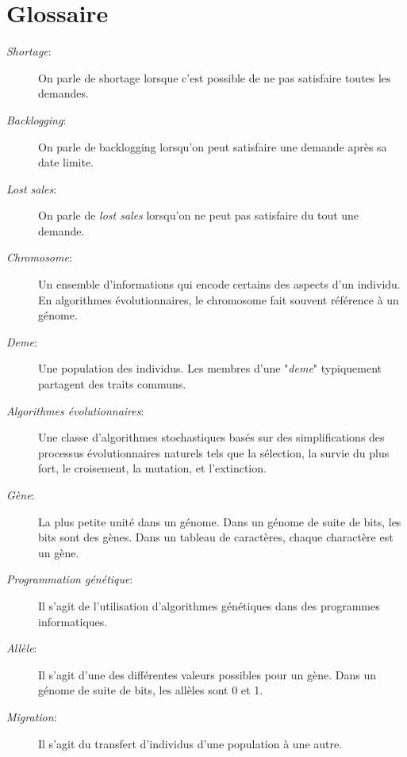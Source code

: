\documentclass[12pt,a4paper]{article}
\begin{document}
	\section{Glossaire}
	\begin{description}
		\item[\emph{Shortage}:] On parle de shortage lorsque c'est possible de ne pas satisfaire toutes les demandes.
		\vspace*{.3cm}
		\item[\emph{Backlogging}:] On parle de backlogging lorsqu'on peut satisfaire une demande après sa date limite.
		\vspace*{.3cm}
		\item[\emph{Lost sales}:] On parle de \emph{lost sales} lorsqu'on ne peut pas satisfaire du tout une demande. 
		\vspace*{.3cm}
		\item[\emph{Chromosome}:] Un ensemble d'informations qui encode certains des aspects d'un individu. En algorithmes évolutionnaires, le chromosome fait souvent référence à un génome.
		\vspace*{.3cm}
		\item[\emph{Deme}:] Une population des individus. Les membres d'une "\emph{deme}" typiquement partagent des traits communs.
		\vspace*{.3cm}
		\item[\emph{Algorithmes évolutionnaires}:] Une classe d'algorithmes stochastiques basés sur des simplifications des processus évolutionnaires naturels tels que la sélection, la survie du plus fort, le croisement, la mutation, et l'extinction.
		\vspace*{.3cm}
		\item[\emph{Gène}:] La plus petite unité dans un génome. Dans un génome de suite de bits, les bits sont des gènes. Dans un tableau de caractères, chaque charactère est un gène. 
		\vspace*{.3cm}
		\item[\emph{Programmation génétique}:] Il s'agit de l'utilisation d'algorithmes génétiques dans des programmes informatiques.
		\vspace*{.3cm}
		\item[\emph{Allèle}:] Il s'agit d'une des différentes valeurs possibles pour un gène. Dans un génome de suite de bits, les allèles sont 0 et 1.
		\vspace*{.3cm}
		\item[\emph{Migration}:] Il s'agit du transfert d'individus d'une population à une autre.
		\vspace*{.3cm}

\end{description}
\end{document}
